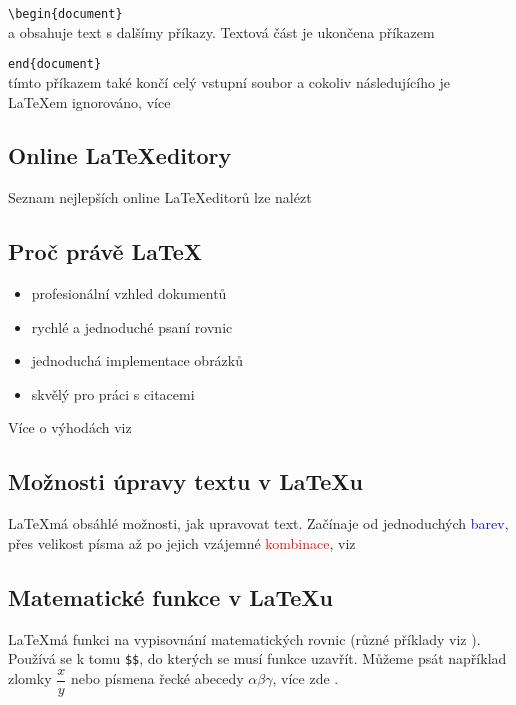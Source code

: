 \documentclass[a4paper, 11pt]{article}
\begin{document}
\verb-\begin{document}-\\
a obsahuje text s dalšímy příkazy. Textová část je ukončena příkazem

\verb-end{document}-\\
tímto příkazem také končí celý vstupní soubor a cokoliv následujícího je \LaTeX em ignorováno, více \cite{Divila2016thesis}
\subsection{Online \LaTeX \;editory}
Seznam nejlepších online \LaTeX \;editorů lze nalézt \cite{an_8.6_7.9_2021} 
\subsection{Proč právě \LaTeX}
\begin{itemize}
    \item profesionální vzhled dokumentů
    \item rychlé a jednoduché psaní rovnic
    \item jednoduchá implementace obrázků
    \item skvělý pro práci s citacemi
    
\end{itemize}
Více o výhodách viz \cite{rysava_2019}

\subsection{Možnosti úpravy textu v \LaTeX u}
\LaTeX \;má obsáhlé možnosti, jak upravovat text. Začínaje od jednoduchých \textcolor{blue}{barev}, přes velikost {\huge písma} až po jejich vzájemné \textcolor{red}{\Large kombinace}, viz \cite{kopka_daly_2013}
\subsection{Matematické funkce v \LaTeX u}
\LaTeX \;má funkci na vypisovnání matematických rovnic (různé příklady viz \cite{CazarezCastro2012}). Používá se k tomu \verb-$$-, do kterých se musí funkce uzavřít. Můžeme psát například zlomky $\dfrac{x}{y}$ nebo písmena řecké abecedy $\alpha \beta \gamma$, více zde \cite{Olsak2014}.
\newpage

\renewcommand{\refname}{Použitá literatura}

\end{document}
